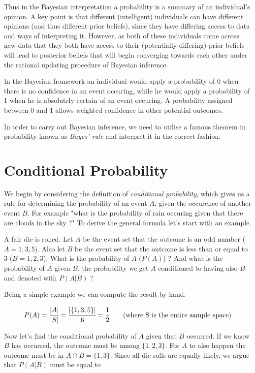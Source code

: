 Thus in the Bayesian interpretation a probability is a summary of an individual's opinion. A key point is that different (intelligent) individuals can have different opinions (and thus different prior beliefs), since they have differing access to data and ways of interpreting it. However, as both of these individuals come across new data that they both have access to their (potentially differing) prior beliefs will lead to posterior beliefs that will begin converging towards each other under the rational updating procedure of Bayesian inference.

In the Bayesian framework an individual would apply a probability of 0 when there is no confidence in an event occuring, while he would apply a probability of 1 when he is absolutely certain of an event occuring. A probability assigned between 0 and 1 allows weighted confidence in other potential outcomes.

In order to carry out Bayesian inference, we need to utilise a famous theorem in probability known as \emph{Bayes' rule} and interpret it in the correct fashion.

\section{Conditional Probability}
\label{sec:conditional_prob}
We begin by considering the definition of \emph{conditional probability}, which gives us a rule for determining the probability of an event $A$, given the occurence of another event $B$. For example "what is the probability of rain occuring given that there are clouds in the sky ?"
To derive the general formula let's start with an example.

A fair die is rolled. Let $A$ be the event set that the outcome is an odd number ($A={1,3,5}$). Also let $B$ be the event set that the outcome is less than or equal to $3$ ($B={1,2,3}$). What is the probability of $A$ ($P(A)$) ? And what is the probability of $A$ given $B$, the probability we get $A$ conditioned to having also $B$ and denoted with $P(A|B)$ ?

Being a simple example we can compute the result by hand:

\begin{equation}
P(A) = \cfrac{|A|}{|S|} = \cfrac{|\{1,3,5\}|}{6} = \cfrac{1}{2}\qquad\textrm{(where S is the entire sample space)}
\end{equation}

Now let's find the conditional probability of $A$ given that $B$ occurred. If we know $B$ has occurred, the outcome must be among $\{1,2,3\}$. For $A$ to also happen the outcome must be in $A\cap B = \{1,3\}$. Since all die rolls are equally likely, we argue that $P(A|B)$ must be equal to

